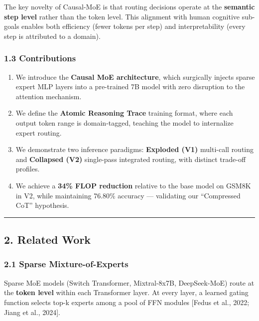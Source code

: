 The key novelty of Causal-MoE is that routing decisions operate at the
\textbf{semantic step level} rather than the token level. This alignment
with human cognitive sub-goals enables both efficiency (fewer tokens per
step) and interpretability (every step is attributed to a domain).

\subsubsection{1.3 Contributions}\label{contributions}

\begin{enumerate}
\def\labelenumi{\arabic{enumi}.}
\tightlist
\item
  We introduce the \textbf{Causal MoE architecture}, which surgically
  injects sparse expert MLP layers into a pre-trained 7B model with zero
  disruption to the attention mechanism.
\item
  We define the \textbf{Atomic Reasoning Trace} training format, where
  each output token range is domain-tagged, teaching the model to
  internalize expert routing.
\item
  We demonstrate two inference paradigms: \textbf{Exploded (V1)}
  multi-call routing and \textbf{Collapsed (V2)} single-pass integrated
  routing, with distinct trade-off profiles.
\item
  We achieve a \textbf{34\% FLOP reduction} relative to the base model
  on GSM8K in V2, while maintaining 76.80\% accuracy --- validating our
  ``Compressed CoT'' hypothesis.
\end{enumerate}

\begin{center}\rule{0.5\linewidth}{0.5pt}\end{center}

\subsection{2. Related Work}\label{related-work}

\subsubsection{2.1 Sparse
Mixture-of-Experts}\label{sparse-mixture-of-experts}

Sparse MoE models (Switch Transformer, Mixtral-8x7B, DeepSeek-MoE) route
at the \textbf{token level} within each Transformer layer. At every
layer, a learned gating function selects top-k experts among a pool of
FFN modules {[}Fedus et al., 2022; Jiang et al., 2024{]}.

